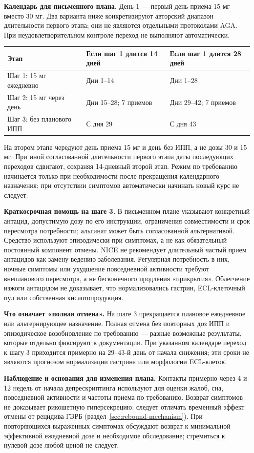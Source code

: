 \documentclass[11pt,a4paper,notitlepage]{report}
\newcommand{\src}[1]{\unskip\space\cite{#1}}
\begin{document}
\textbf{Календарь для письменного плана.} День 1 --- первый день приема 15 мг вместо 30 мг. Два варианта ниже конкретизируют авторский диапазон длительности первого этапа; они не являются отдельными протоколами AGA. При неудовлетворительном контроле переход не выполняют автоматически.
\begin{longtable}{P{0.27\textwidth}P{0.30\textwidth}P{0.34\textwidth}}
\toprule
Этап & Если шаг 1 длится 14 дней & Если шаг 1 длится 28 дней \\
\midrule
\endhead
Шаг 1: 15 мг ежедневно & Дни 1--14 & Дни 1--28 \\
Шаг 2: 15 мг через день & Дни 15--28; 7 приемов & Дни 29--42; 7 приемов \\
Шаг 3: без планового ИПП & С дня 29 & С дня 43 \\
\bottomrule
\end{longtable}
На втором этапе чередуют день приема 15 мг и день без ИПП, а не дозы 30 и 15 мг. При иной согласованной длительности первого этапа даты последующих переходов сдвигают, сохраняя 14-дневный второй этап. Режим по требованию начинается только при необходимости после прекращения календарного назначения; при отсутствии симптомов автоматически начинать новый курс не следует.

\textbf{Краткосрочная помощь на шаге 3.} В письменном плане указывают конкретный антацид, допустимую дозу по его инструкции, ограничения совместимости и срок пересмотра потребности; альгинат может быть согласованной альтернативой. Средство используют эпизодически при симптомах, а не как обязательный постоянный компонент отмены. NICE не рекомендует длительный частый прием антацидов как замену ведению заболевания. Регулярная потребность в них, ночные симптомы или ухудшение повседневной активности требуют внепланового пересмотра, а не бесконечного продления «прикрытия». Облегчение изжоги антацидом не доказывает, что нормализовались гастрин, ECL-клеточный пул или собственная кислотопродукция.\src{nice,withdrawfarrell2017}

\textbf{Что означает «полная отмена».} На шаге 3 прекращается плановое ежедневное или альтернирующее назначение. Полная отмена без повторных доз ИПП и эпизодическое возобновление по требованию --- разные возможные результаты, которые отдельно фиксируют в документации. При указанном календаре переход к шагу 3 приходится примерно на 29--43-й день от начала снижения; эти сроки не являются прогнозом нормализации гастрина или морфологии ECL-клеток.

\textbf{Наблюдение и основания для изменения плана.} Контакты примерно через 4 и 12 недель от начала депрескриптинга используют для оценки жалоб, сна, повседневной активности и частоты приема по требованию. Возврат симптомов не доказывает рикошетную гиперсекрецию: следует отличать временный эффект отмены от рецидива ГЭРБ (раздел~\ref{sec:rebound-mechanism}). При повторяющихся выраженных симптомах обсуждают возврат к минимальной эффективной ежедневной дозе и необходимое обследование; стремиться к нулевой дозе любой ценой не следует.\src{withdrawfarrell2017,acggerd}
\end{document}
